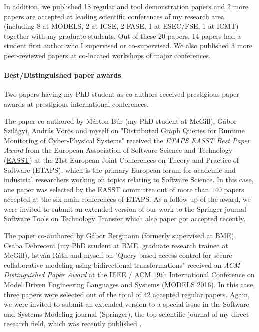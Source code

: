 \documentclass[a4paper,11pt]{report}
\begin{document}
In addition, we published 18 regular and tool demonstration papers and 2 more papers are accepted at leading scientific conferences of my research area (including 8 at MODELS, 2 at ICSE, 2 FASE, 1 at ESEC/FSE, 1 at ICMT) together with my graduate students. Out of these 20 papers,  14 papers had a student first author who I supervised or co-supervised. 
We also published 3 more peer-reviewed papers at co-located workshops of major conferences. 

\paragraph{Best/Distinguished paper awards}
Two papers having my PhD student as co-authors received prestigious paper awards at prestigious international conferences. 

The paper co-authored by Márton Búr (my PhD student at McGill), Gábor Szilágyi, András Vörös and myself on "Distributed Graph Queries for Runtime Monitoring of Cyber-Physical Systems" \cite{fase2018-cps} received the \emph{ETAPS EASST Best Paper Award} from the European Association of Software Science and Technology (\href{http://easst.aulp.co.uk/}{EASST}) at the 21st European Joint Conferences on Theory and Practice of Software (ETAPS), which is the primary European forum for academic and industrial researchers working on topics relating to Software Science. In this case, one paper was selected by the EASST committee out of more than 140 papers accepted at the six main conferences of ETAPS. As a follow-up of the award, we were invited to submit an extended version of our work to the Springer journal Software Tools on Technology Transfer which also paper \cite{sttt-2019} got accepted recently. 

The paper co-authored by Gábor Bergmann (formerly supervised at BME), Csaba Debreceni (my PhD student at BME, graduate research trainee at McGill), István Ráth and myself on "Query-based access control for secure collaborative modeling using bidirectional transformations" \cite{MODELS2016-access} received an \emph{ACM Distinguished Paper Award} at the IEEE / ACM 19th International Conference on Model Driven Engineering Languages and Systems (MODELS 2016). In this case, three papers were selected out of the total of 42 accepted regular papers. Again, we were invited to submit an extended version to a special issue in the Software and Systems Modeling journal (Springer), the top scientific journal of my direct research field, which was recently published \cite{sosym2017-mondo}.
\end{document}
